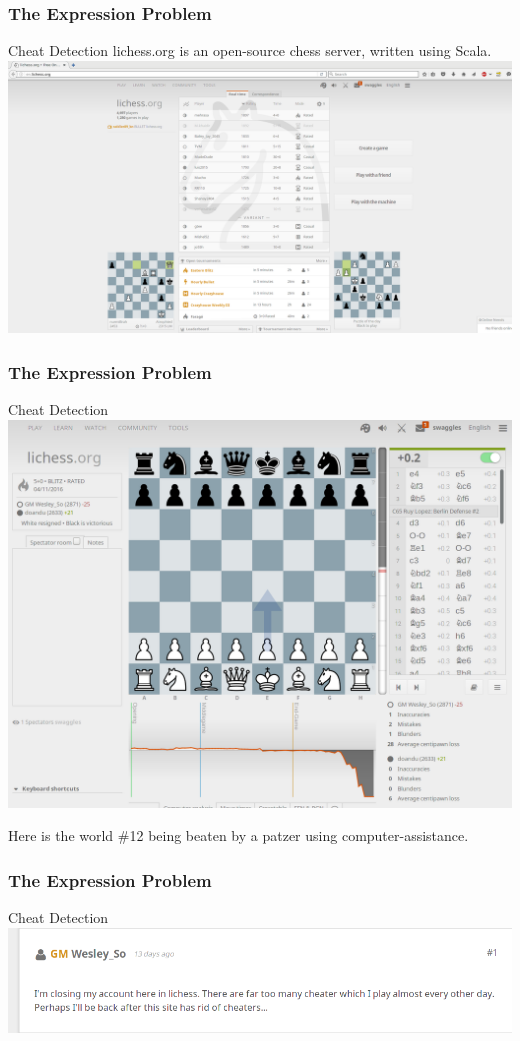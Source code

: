 \begin{frame}[fragile]
\frametitle{The Expression Problem}
\begin{block}{Cheat Detection}
lichess.org is an open-source chess server, written using Scala.
\includegraphics[height=0.4\textheight,natwidth=1867,natheight=1011]{image/lichess.png}
\end{block}
\end{frame}

\begin{frame}[fragile]
\frametitle{The Expression Problem}
\begin{block}{Cheat Detection}
\includegraphics[height=0.5\textheight,natwidth=1140,natheight=878]{image/lichess-wesley-so.png}
\par
Here is the world \#12 being beaten by a patzer using computer-assistance.
\end{block}
\end{frame}

\begin{frame}[fragile]
\frametitle{The Expression Problem}
\begin{block}{Cheat Detection}
\includegraphics[height=0.2\textheight,natwidth=883,natheight=184]{image/lichess-wesley-so-announce.png}
\par
\end{block}
\end{frame}
